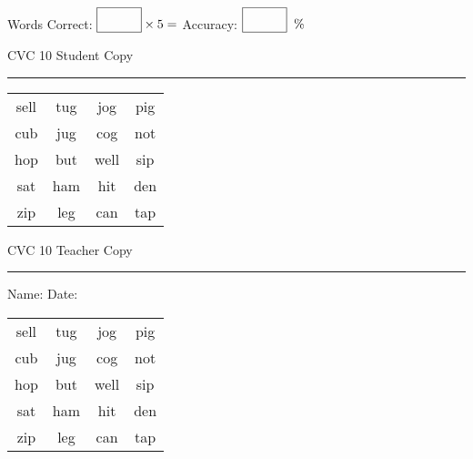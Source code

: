 \documentclass{memoir}
\begin{document}
\normalsize

Words Correct: $\fbox{\phantom{\huge 100}} \times 5 = $ Accuracy: $\fbox{\phantom{\huge 100}}\;\; \%$ 

\vfill

\newpage


\footnotesize \noindent
CVC 10 \hfill Student Copy
\smallskip
\hrule

\huge

\setlength{\tabcolsep}{14pt}
\def\arraystretch{2}

{\selectfont


\begin{vplace}[0.5]
\begin{center}
\begin{tabular}{cccc}
sell & tug & jog & pig \\
cub & jug & cog & not \\
hop & but & well & sip \\
sat & ham & hit & den \\
zip & leg & can & tap \\
\end{tabular}
\end{center}
\end{vplace}

}

\newpage

\footnotesize \noindent
CVC 10 \hfill Teacher Copy
\smallskip
\hrule

\normalsize

\vfill

\noindent
Name: \underline{\hspace{1.75in}} \hfill Date: \underline{\hspace{1in}}

\huge

{\selectfont


\begin{vplace}[0.5]
\begin{center}
\begin{tabular}{cccc}
sell & tug & jog & pig \\
cub & jug & cog & not \\
hop & but & well & sip \\
sat & ham & hit & den \\
zip & leg & can & tap \\
\end{tabular}
\end{center}
\end{vplace}



}
\end{document}
